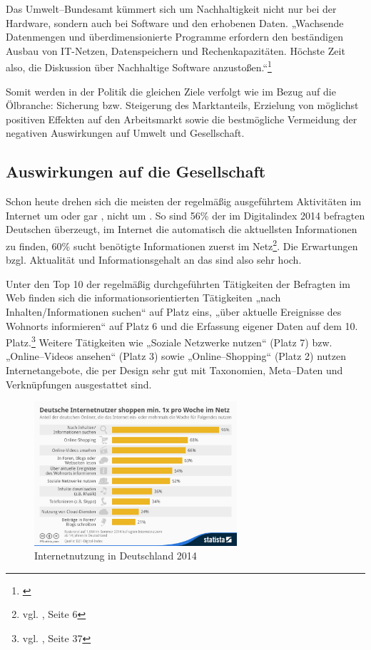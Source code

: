 Das Umwelt--Bundesamt kümmert sich um Nachhaltigkeit nicht nur bei der Hardware, sondern auch bei Software und den erhobenen Daten. „Wachsende Datenmengen und überdimensionierte Programme erfordern den beständigen Ausbau von IT-Netzen, Datenspeichern und Rechenkapazitäten. Höchste Zeit also, die Diskussion über Nachhaltige Software anzustoßen.“\footnote{\cite{fns}} 

Somit werden in der Politik die gleichen Ziele verfolgt wie im Bezug auf die Ölbranche: Sicherung bzw. Steigerung des Marktanteils, Erzielung von möglichst positiven Effekten auf den Arbeitsmarkt sowie die bestmögliche Vermeidung der negativen Auswirkungen auf Umwelt und Gesellschaft.

\subsection{Auswirkungen auf die Gesellschaft}

Schon heute drehen sich die meisten der regelmäßig ausgeführtem Aktivitäten im Internet um  oder gar , nicht um . So sind 56\% der im Digitalindex 2014 befragten Deutschen überzeugt, im Internet die automatisch die aktuellsten Informationen zu finden, 60\% sucht benötigte Informationen zuerst im Netz\footnote{vgl. \cite{d21}, Seite 6}. Die Erwartungen bzgl. Aktualität und Informationsgehalt an das  sind also sehr hoch. 

Unter den Top 10 der regelmäßig durchgeführten Tätigkeiten der Befragten im Web finden sich die informationsorientierten Tätigkeiten „nach Inhalten/Informationen suchen“ auf Platz eins, „über aktuelle Ereignisse des Wohnorts informieren“ auf Platz 6 und die Erfassung eigener Daten auf dem 10. Platz.\footnote{vgl. \cite{d21}, Seite 37} Weitere Tätigkeiten wie „Soziale Netzwerke nutzen“ (Platz 7) bzw. „Online--Videos ansehen“ (Platz 3) sowie „Online--Shopping“ (Platz 2) nutzen Internetangebote, die per Design sehr gut mit Taxonomien, Meta--Daten und Verknüpfungen ausgestattet sind.

\begin{figure}[H]
\begin{center}
\includegraphics[width=0.67\textwidth]{inetnutzung.jpg}
\caption[Internetnutzung in Deutschland 2014]{Internetnutzung in Deutschland 2014\protect\footnotemark}
\label{pic:inetnutzung}
\end{center}
\end{figure}

